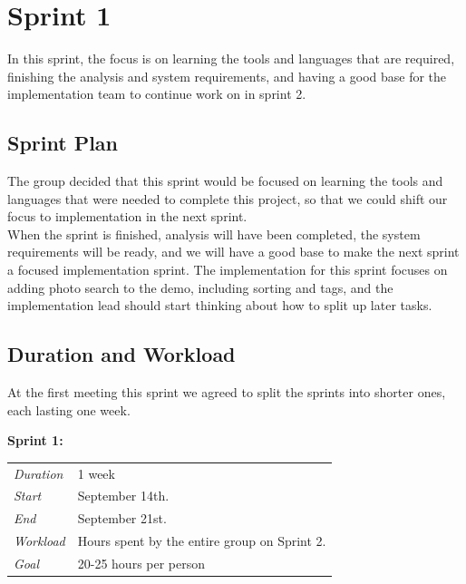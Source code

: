 \chapter{Sprint 1}
\label{chap:S1}
In this sprint, the focus is on learning the tools and languages that are required, finishing the analysis and system requirements, and having a good base for the implementation team to continue work on in sprint 2.

\section{Sprint Plan}
\label{sec:S1Planning}
The group decided that this sprint would be focused on learning the tools and languages that were needed to complete this project, so that we could shift our focus to implementation in the next sprint. \\
\indent When the sprint is finished, analysis will have been completed, the system requirements will be ready, and we will have a good base to make the next sprint a focused implementation sprint. The implementation for this sprint focuses on adding photo search to the demo, including sorting and tags, and the implementation lead should start thinking about how to split up later tasks.

\section{Duration and Workload}
\label{sec:S1DurationWorkload}
At the first meeting this sprint we agreed to split the sprints into shorter ones, each lasting one week. \\

\begin{minipage}{\linewidth}
\centering
\setlength{\tabcolsep}{22pt}
\textbf{Sprint 1:} 
\smallskip
{}
\begin{tabular}{ |l l| }
	\hline
	\it{Duration} & 1 week \\
	\it{Start} & September 14th. \\
	\it{End} & September 21st. \\
	\it{Workload} & Hours spent by the entire group on Sprint 2. \\
	\it{Goal} & 20-25 hours per person \\
	\hline
\end{tabular}
\end{minipage}

